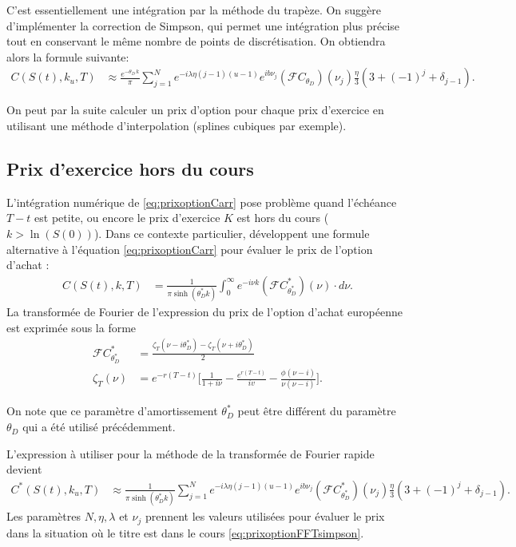 C'est essentiellement une intégration par la méthode du trapèze. On
suggère d'implémenter la correction de Simpson, qui permet une
intégration plus précise tout en conservant le même nombre de points
de discrétisation. On obtiendra alors la formule suivante:
\begin{align}
  C(S(t),k_u,T) &\approx \frac{e^{-\theta_D\,k}}{\pi} \sum_{j=1}^N
  e^{-i\lambda\eta(j-1)(u-1)} e^{ib\nu_j}
  (\mathcal{F}C_{\theta_D})(\nu_j) \frac{\eta}{3} \left(3 + (-1)^j +
    \delta_{j-1}\right). \label{eq:prixoptionFFTsimpson}
\end{align}

On peut par la suite calculer un prix d'option pour chaque prix
d'exercice en utilisant une méthode d'interpolation (splines cubiques
par exemple).

\subsection{Prix d'exercice hors du cours}
\label{sec:outofmoneyfft}

L'intégration numérique de \eqref{eq:prixoptionCarr} pose problème
quand l'échéance $T-t$ est petite, ou encore le prix d'exercice $K$
est hors du cours ($k > \ln(S(0))$). Dans ce contexte particulier,
\cite{carr1999option} développent une formule alternative à l'équation
\eqref{eq:prixoptionCarr} pour évaluer le prix de l'option d'achat :
\begin{align}
  C(S(t),k,T) &= \frac{1}{\pi\sinh(\theta^{*}_D k)} \int_{0}^{\infty}
  e^{-i\nu k} (\mathcal{F}C^{*}_{\theta^{*}_D})(\nu)\cdot
  d\nu. \label{eq:prixoptionCarrOOM}
\end{align}
La transformée de Fourier de l'expression du prix de l'option d'achat
européenne est exprimée sous la forme
\begin{align}
  \mathcal{F}C^{*}_{\theta^{*}_D} &= \frac{\zeta_T(\nu-i\theta^{*}_D) - \zeta_T(\nu+i\theta^{*}_D)}{2}\\
  \zeta_T(\nu) &= e^{-r(T-t)}\bigg[\frac{1}{1+i\nu} -
  \frac{e^{r(T-t)}}{iv} - \frac{\phi(\nu-i)}{\nu(\nu-i)} \bigg].
  \nonumber
\end{align}

On note que ce paramètre d'amortissement $\theta^{*}_D$ peut être
différent du paramètre $\theta_D$ qui a été utilisé précédemment.

L'expression à utiliser pour la méthode de la transformée de Fourier
rapide devient
\begin{align}
  C^{*}(S(t),k_u,T) &\approx \frac{1}{\pi\sinh(\theta^{*}_D k)}
  \sum_{j=1}^N e^{-i\lambda\eta(j-1)(u-1)} e^{ib\nu_j}
  (\mathcal{F}C^{*}_{\theta^{*}_D})(\nu_j) \frac{\eta}{3} \left(3 +
    (-1)^j + \delta_{j-1}\right). \label{eq:prixoptionFFTsimpsonOOM}
\end{align}
Les paramètres $N ,\eta, \lambda$ et $\nu_j$ prennent les valeurs
utilisées pour évaluer le prix dans la situation où le titre est dans
le cours \eqref{eq:prixoptionFFTsimpson}.

